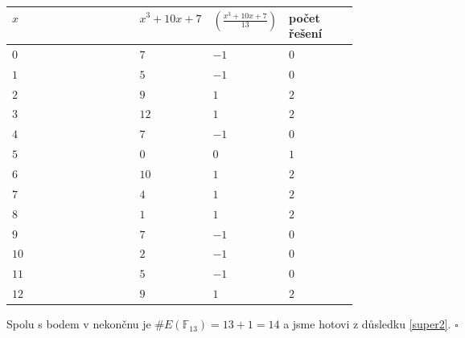 \documentclass [12pt]{report}
\begin{document}
\begin{longtable}[H]{l>{\centering}p{0.2\linewidth}>{\raggedleft}p{0.1\linewidth}>{\centering\arraybackslash}p{0.2\linewidth}}
\toprule
$x$ & $x^3+10x+7$ & $\genfrac{(}{)}{}{}{x^3+10x+7}{13}$ & počet řešení\\
\midrule
$0$ & $7$  & $-1\quad\;$  & $0$\\
$1$ & $5$  & $-1\quad\;$  & $0$\\
$2$ & $9$  & $1\quad\;$  & $2$\\
$3$ & $12$  & $1\quad\;$  & $2$\\
$4$ & $7$  & $-1\quad\;$  & $0$\\
$5$ & $0$  & $0\quad\;$  & $1$\\
$6$ & $10$  & $1\quad\;$  & $2$\\
$7$ & $4$  & $1\quad\;$  & $2$\\
$8$ & $1$  & $1\quad\;$  & $2$\\
$9$ & $7$  & $-1\quad\;$  & $0$\\
$10$ & $2$  & $-1\quad\;$  & $0$\\
$11$ & $5$  & $-1\quad\;$  & $0$\\
$12$ & $9$  & $1\quad\;$  & $2$\\
\bottomrule 
\end{longtable}


Spolu s bodem v nekončnu je $\# E(\mathbb{F}_{13})=13+1=14$ a jsme hotovi z důsledku \ref{super2}. \hfill $\square$\\
\end{document}
